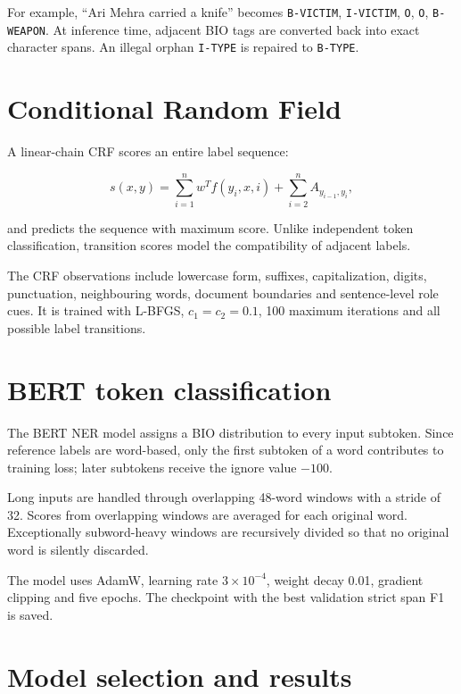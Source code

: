 \documentclass[12pt,a4paper]{report}
\newcommand{\code}[1]{\texttt{#1}}
\begin{document}
For example, ``Ari Mehra carried a knife'' becomes \code{B-VICTIM}, \code{I-VICTIM}, \code{O}, \code{O}, \code{B-WEAPON}. At inference time, adjacent BIO tags are converted back into exact character spans. An illegal orphan \code{I-TYPE} is repaired to \code{B-TYPE}.

\section{Conditional Random Field}

A linear-chain CRF scores an entire label sequence:

\begin{equation}
s(x,y)=\sum_{i=1}^{n}w^Tf(y_i,x,i)+\sum_{i=2}^{n}A_{y_{i-1},y_i},
\end{equation}

and predicts the sequence with maximum score. Unlike independent token classification, transition scores model the compatibility of adjacent labels.

The CRF observations include lowercase form, suffixes, capitalization, digits, punctuation, neighbouring words, document boundaries and sentence-level role cues. It is trained with L-BFGS, $c_1=c_2=0.1$, 100 maximum iterations and all possible label transitions.

\section{BERT token classification}

The BERT NER model assigns a BIO distribution to every input subtoken. Since reference labels are word-based, only the first subtoken of a word contributes to training loss; later subtokens receive the ignore value $-100$.

Long inputs are handled through overlapping 48-word windows with a stride of 32. Scores from overlapping windows are averaged for each original word. Exceptionally subword-heavy windows are recursively divided so that no original word is silently discarded.

The model uses AdamW, learning rate $3\times10^{-4}$, weight decay 0.01, gradient clipping and five epochs. The checkpoint with the best validation strict span F1 is saved.

\section{Model selection and results}
\end{document}
